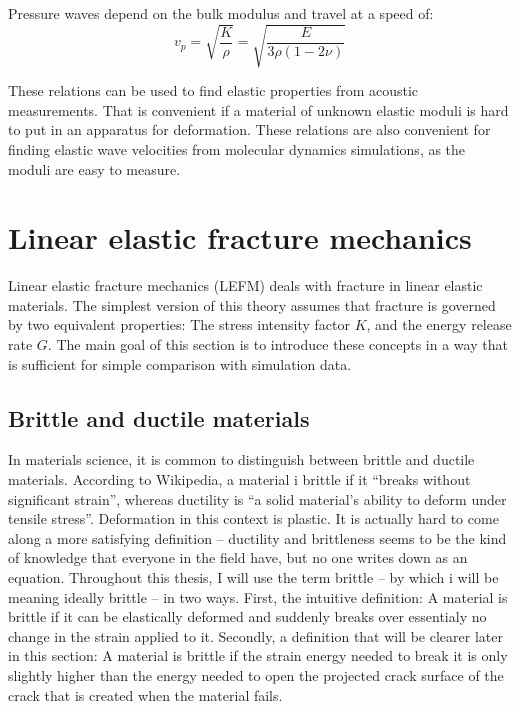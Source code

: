Pressure waves depend on the bulk modulus and travel at a speed of:
\begin{equation}
	v_p = \sqrt{\frac{K}{\rho}} = \sqrt{\frac{E}{3\rho(1-2\nu)}}
\end{equation}

These relations can be used to find elastic properties from acoustic measurements. That is convenient if a material of unknown elastic moduli is hard to put in an apparatus for deformation. These relations are also convenient for finding elastic wave velocities from molecular dynamics simulations, as the moduli are easy to measure.


\section{Linear elastic fracture mechanics}
Linear elastic fracture mechanics (LEFM) deals with fracture in linear elastic materials. The simplest version of this theory assumes that fracture is governed by two equivalent properties: The stress intensity factor $K$, and the energy release rate $G$. The main goal of this section is to introduce these concepts in a way that is sufficient for simple comparison with simulation data. 

\subsection{Brittle and ductile materials}
In materials science, it is common to distinguish between brittle and ductile materials. According to Wikipedia, a material i brittle if it ``breaks without significant strain'', whereas ductility is ``a solid material's ability to deform under tensile stress''. Deformation in this context is plastic. It is actually hard to come along a more satisfying definition -- ductility and brittleness seems to be the kind of knowledge that everyone in the field have, but no one writes down as an equation. Throughout this thesis, I will use the term brittle -- by which i will be meaning ideally brittle -- in two ways. First, the intuitive definition: A material is brittle if it can be elastically deformed and suddenly breaks over essentialy no change in the strain applied to it. Secondly, a definition that will be clearer later in this section: A material is brittle if the strain energy needed to break it is only slightly higher than the energy needed to open the projected crack surface of the crack that is created when the material fails.

